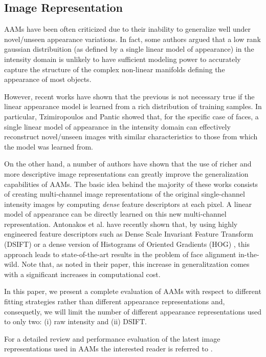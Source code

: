 \subsection{Image Representation}
\label{sec:appearance}

AAMs have been often criticized due to their inability to generalize well under novel/unseen appearance variations. In fact, some authors \cite{Gross2005, vanderMaaten2010} argued that a low rank gaussian distribuition (as defined by a single linear model of appearance) in the intensity domain is unlikely to have sufficient modeling power to accurately capture the structure of the complex non-linear manifolds defining the appearance of most objects.

However, recent works \cite{Tzimiropoulos2013, Alabort2014, Tzimiropoulos2014, Kossaifi2014} have shown that the previous is not necessary true if the linear appearance model is learned from a rich distribution of training samples. In particular, Tzimiropoulos and Pantic \cite{Tzimiropoulos2013} showed that, for the specific case of faces, a single linear model of appearance  in the intensity domain can effectively reconstruct novel/unseen images with similar characteristics to those from which the model was learned from. 

On the other hand, a number of authors \cite{Cootes2001b,Kittipanya2006,Langs2006,Zhou2010,Lucey2013,Tzimiropoulos2012,Tzimiropoulos2014,Antonakos2014} have shown that the use of richer and more descriptive image representations can greatly improve the generalization capabilities of AAMs. The basic idea behind the majority of these works consists of creating multi-channel image representations of the original single-channel intensity images by computing \emph{dense} feature descriptors at each pixel. A linear model of appearance can be directly learned on this new multi-channel representation. Antonakos et al. \cite{Antonakos2014} have recently shown that, by using highly engineered feature descriptors such as Dense Scale Invariant Feature Transform (DSIFT) \cite{Lowe1999,Ce2011} or a dense version of Histograms of Oriented Gradients (HOG) \cite{Dalal2005}, this approach leads to state-of-the-art results in the problem of face alignment in-the-wild. Note that, as noted in their paper, this increase in generalitzation comes with a significant increases in computational cost.

In this paper, we present a complete evaluation of AAMs with respect to different fitting strategies rather than different appearance representations and, consequetly, we will limit the number of different appearance representations used to only two: (i) raw intensity and (ii) DSIFT. 

For a detailed review and performance evaluation of the latest image representations used in AAMs the interested reader is referred to \cite{Antonakos2014}.